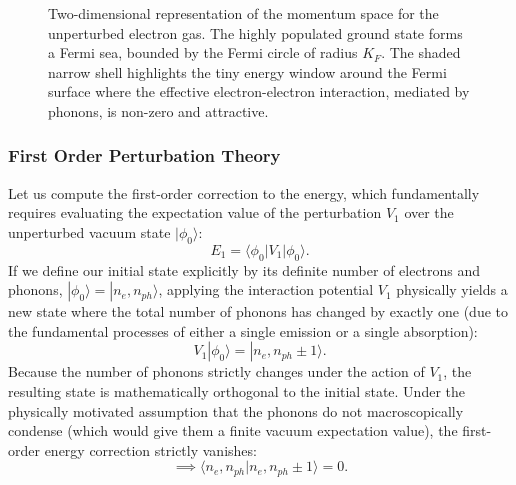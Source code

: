 \begin{figure}[H]
    \begin{minipage}{0.5\textwidth}
        \centering
    \end{minipage}
    \hfill
    \begin{minipage}{0.45\textwidth}
        \caption{Two-dimensional representation of the momentum space for the unperturbed electron gas. The highly populated ground state forms a Fermi sea, bounded by the Fermi circle of radius \(K_F\). The shaded narrow shell highlights the tiny energy window around the Fermi surface where the effective electron-electron interaction, mediated by phonons, is non-zero and attractive.}
        \label{fig:fermi_sea_shell}
    \end{minipage}
\end{figure}

\subsubsection{First Order Perturbation Theory}

Let us compute the first-order correction to the energy, which fundamentally requires evaluating the expectation value of the perturbation \(V_1\) over the unperturbed vacuum state \(|\phi_0\rangle\):
\[
    E_1 = \langle \phi_0 | V_1 | \phi_0 \rangle.
\]
If we define our initial state explicitly by its definite number of electrons and phonons, \(|\phi_0\rangle = |n_e, n_{ph}\rangle\), applying the interaction potential \(V_1\) physically yields a new state where the total number of phonons has changed by exactly one (due to the fundamental processes of either a single emission or a single absorption):
\[
    V_1 | \phi_0 \rangle = |n_e, n_{ph} \pm 1\rangle.
\]
Because the number of phonons strictly changes under the action of \(V_1\), the resulting state is mathematically orthogonal to the initial state. Under the physically motivated assumption that the phonons do not macroscopically condense (which would give them a finite vacuum expectation value), the first-order energy correction strictly vanishes:
\[
    \implies \langle n_e, n_{ph} | n_e, n_{ph} \pm 1 \rangle = 0.
\]

